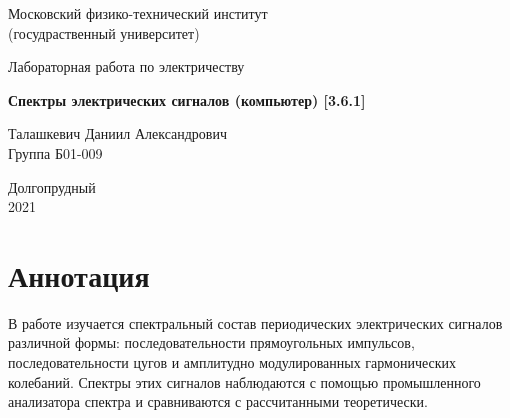 \documentclass[a4paper, 12pt]{article}%
\begin{document}


\begin{titlepage}

	\newpage
	\begin{center}
		\normalsize Московский физико-технический институт \\(госудраственный 			университет)
	\end{center}

	\vspace{6em}

	\begin{center}
		\Large Лабораторная работа по электричеству\\
	\end{center}

	\vspace{1em}

	\begin{center}
		\large \textbf{Спектры электрических сигналов (компьютер) [3.6.1]}
	\end{center}

	\vspace{2em}

	\begin{center}
		\large Талашкевич Даниил Александрович\\
		Группа Б01-009
	\end{center}

	\vspace{\fill}

	\begin{center}
	Долгопрудный \\2021
	\end{center}
	
\end{titlepage}



	\thispagestyle{empty}
	\newpage
	\tableofcontents
	\newpage
	\setcounter{page}{1}



\section{Аннотация}

В работе изучается спектральный состав периодических электрических сигналов различной формы: последовательности прямоугольных импульсов, последовательности цугов и амплитудно модулированных гармонических колебаний. Спектры этих сигналов наблюдаются с помощью промышленного анализатора спектра и сравниваются с рассчитанными теоретически. 
\end{document}
